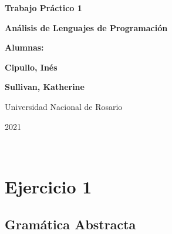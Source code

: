 \documentclass[11pt]{article}
\begin{document}
\begin{titlepage}
    \begin{center}
        \vfill
        \vfill
            \vspace{0.7cm}
            \noindent\textbf{\Huge Trabajo Práctico 1}\par
            \noindent\textbf{\Huge Análisis de Lenguajes de Programación}\par
            \vspace{.5cm}
        \vfill
        \noindent \textbf{\huge Alumnas:}\par
        \vspace{.5cm}
        \noindent \textbf{\Large Cipullo, Inés}\par
        \noindent \textbf{\Large Sullivan, Katherine}\par
 
        \vfill
        \large Universidad Nacional de Rosario \par
        \noindent\large 2021
    \end{center}
\end{titlepage}
\ \par




\section*{Ejercicio 1}

\subsection*{Gramática Abstracta}
\end{document}
